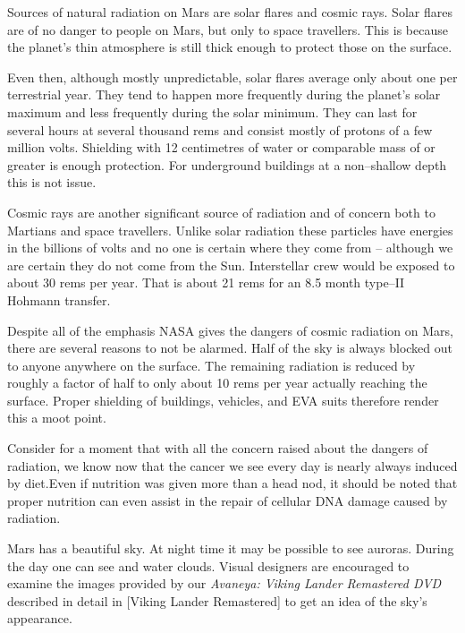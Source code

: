 Sources of natural radiation on Mars are solar flares and cosmic rays. Solar flares are of no danger to people on Mars, but only to space travellers. This is because the planet's thin atmosphere is still thick enough to protect those on the surface. 

Even then, although mostly unpredictable, solar flares average only about one per terrestrial year. They tend to happen more frequently during the planet's solar maximum and less frequently during the solar minimum. They can last for several hours at several thousand rems and consist mostly of protons of a few million volts. Shielding with 12 centimetres of water or comparable mass of  or greater is enough protection. For underground buildings at a non--shallow depth this is not issue.

Cosmic rays are another significant source of radiation and of concern both to Martians and space travellers. Unlike solar radiation these particles have energies in the billions of volts and no one is certain where they come from -- although we are certain they do not come from the Sun. Interstellar crew would be exposed to about 30 rems per year. That is about 21 rems for an 8.5 month type--II Hohmann transfer.

Despite all of the emphasis NASA gives the dangers of cosmic radiation on Mars, there are several reasons to not be alarmed. Half of the sky is always blocked out to anyone anywhere on the surface. The remaining radiation is reduced by roughly a factor of half to only about 10 rems per year actually reaching the surface. Proper shielding of buildings, vehicles, and EVA suits therefore render this a moot point.

Consider for a moment that with all the concern raised about the dangers of radiation, we know now that the cancer we see every day is nearly always induced by diet. Even if nutrition was given more than a head nod, it should be noted that proper nutrition can even assist in the repair of cellular DNA damage caused by radiation.\footnotecite[cavusoglu2009]

Mars has a beautiful sky. At night time it may be possible to see auroras. During the day one can see  and water clouds. Visual designers are encouraged to examine the images provided by our {\it Avaneya: Viking Lander Remastered DVD} described in detail in [Viking Lander Remastered] to get an idea of the sky's appearance.

